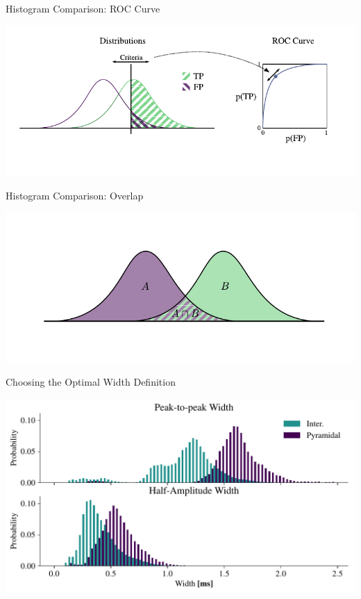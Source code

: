 \documentclass[aspectratio=169]{beamer}
\begin{document}
\begin{frame}{Histogram Comparison: ROC Curve}
    \begin{center}
        \includegraphics[width=\textwidth]{images/roc_curve.pdf}
    \end{center}
\end{frame}

\begin{frame}{Histogram Comparison: Overlap}
    \begin{center}
        \includegraphics[width=\textwidth]{images/hist_inter.pdf}
    \end{center}
\end{frame}

\begin{frame}{Choosing the Optimal Width Definition}
    \begin{center}
        \includegraphics[width=\textwidth]{images/int_pyr_width_I_II.pdf}
    \end{center}
\end{frame}
\end{document}
